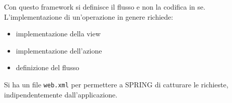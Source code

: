 \documentclass[a4paper,12pt, oneside]{book}
\begin{document}
Con questo framework si definisce il flusso e non la codifica in
se. L'implementazione di un'operazione in genere richiede:
\begin{itemize}
  \item implementazione della view
  \item implementazione dell'azione
  \item definizione del flusso
\end{itemize}
Si ha un file \texttt{web.xml} per permettere a SPRING di catturare le
richieste, indipendentemente dall'applicazione. 
\end{document}

